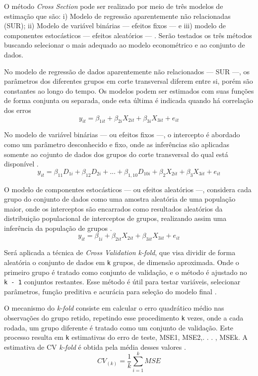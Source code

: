 \documentclass[12pt,openright,oneside,a4paper,chapter=TITLE,section=TITLE,subsection=TITLE,english,french,spanish,portugues,sumario=tradicional]{abntex2}
\begin{document}
O método \emph{Cross Section} pode ser realizado por meio de três modelos de estimação que são: i) Modelo de regressão aparentemente não relacionadas (SUR); ii) Modelo de variável binárias --- efeitos fixos --- e iii) modelo de componentes estocásticos --- efeitos aleatórios --- \cite{hill:2010}. Serão testados os três métodos buscando selecionar o mais adequado ao modelo econométrico e ao conjunto de dados.

No modelo de regressão de dados aparentemente não relacionados --- SUR ---, os parâmetros dos diferentes grupos em corte transversal diferem entre si, porém são constantes ao longo do tempo. Os modelos podem ser estimados com suas funções de forma conjunta ou separada, onde esta última é indicada quando há correlação dos erros \cite{hill:2010}
\[
y_{it} = \beta_{1it} + \beta_{2i}X_{2it} + \beta_{3i}X_{3it} + e_{it}
\]

No modelo de variável binárias --- ou efeitos fixos ---, o intercepto é abordado como um parâmetro desconhecido e fixo, onde as inferências são aplicadas somente ao cojunto de dados dos grupos do corte transversal do qual está disponível \cite{hill:2010}.
\[
y_{it} = \beta_{11}D_{1i} + \beta_{12}D_{2i} + ... + \beta_{1,10}D_{10i} + \beta_{2}X_{2it} + \beta_{3}X_{3it} + e_{it}
\]

O modelo de componentes estocásticos --- ou efeitos aleatórios ---, considera cada grupo do conjunto de dados como uma amostra aleatória de uma população maior, onde os interceptos são encarrados como resultados aleatórios da distribuição populacional de interceptos de grupos, realizando assim uma inferência da população de grupos \cite{hill:2010}.
\[
y_{it} = \beta_{1i} + \beta_{2it}X_{2it} + \beta_{3it}X_{3it} + e_{it}
\]

Será aplicada a técnica de \emph{Cross Validation k-fold}, que visa dividir de forma aleatória o conjunto de dados em \texttt{k} grupos, de dimensão aproximada. Onde o primeiro grupo é tratado como conjunto de validação, e o método é ajustado no \texttt{k\ -\ 1} conjuntos restantes. Esse método é útil para testar variáveis, selecionar parâmetros, função preditiva e acurácia para seleção do modelo final \cite{gareth:2017}.

O mecanismo do \emph{k-fold} consiste em calcular o erro quadrático médio nas observações do grupo retido, repetindo esse procedimento \texttt{k} vezes, onde a cada rodada, um grupo diferente é tratado como um conjunto de validação. Este processo resulta em \texttt{k} estimativas do erro de teste, MSE1, MSE2,. . . , MSEk. A estimativa de CV \emph{k-fold} é obtida pela média desses valores \cite{gareth:2017}.
\[
CV_{(k)} = \frac{1}{k}\sum_{i=1}^{k}MSE  
\]
\end{document}
